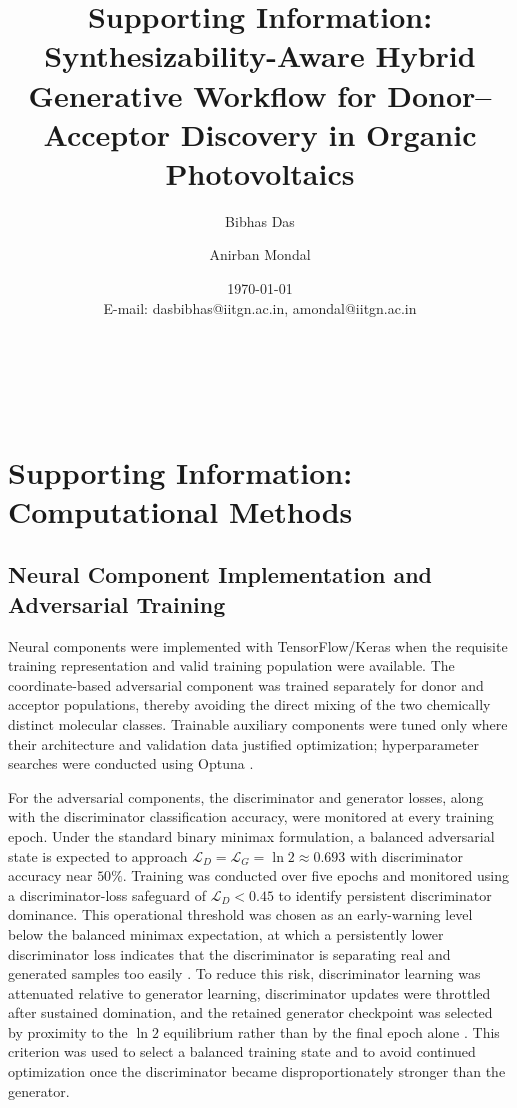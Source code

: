 \documentclass[12pt]{article}
\title{Supporting Information: \\ Synthesizability-Aware Hybrid Generative Workflow for Donor--Acceptor Discovery in Organic Photovoltaics}
\author[1,*]{Bibhas Das}
\author[1,*]{Anirban Mondal}
\affil[1]{\small Department of Chemistry, Indian Institute of Technology Gandhinagar, Gujarat, 382355, India}
\date{\small\today\\ {E-mail: dasbibhas@iitgn.ac.in, amondal@iitgn.ac.in}}
\makeatletter
\renewcommand{\maketitle}{
\begin{center}
{\LARGE \textbf{\@title}} \\[1em]   %
{\large \@author} \\[1em]           %
{\small \@date}                     %
\end{center}
}
\makeatother
\begin{document}
\maketitle
\clearpage

\section{Supporting Information: Computational Methods}
\subsection{Neural Component Implementation and Adversarial Training}
Neural components were implemented with TensorFlow/Keras 
\cite{abadi2016tensorflow} when the requisite training representation and valid training population were available. The coordinate-based adversarial component was trained separately for donor and acceptor populations, thereby avoiding the direct mixing of the two chemically distinct molecular classes. Trainable auxiliary components were tuned only where their architecture and validation data justified optimization; hyperparameter searches were conducted using Optuna 
\cite{akiba2019optuna}.

For the adversarial components, the discriminator and generator losses, along with the discriminator classification accuracy, were monitored at every training epoch. Under the standard binary minimax formulation, a balanced adversarial state is expected to approach $\mathcal{L}_{D}=\mathcal{L}_{G}=\ln 2 \approx 0.693$ with discriminator accuracy near $50\%$. Training was conducted over five epochs and 
monitored using a discriminator-loss safeguard of $\mathcal{L}_{D}<0.45$ to identify persistent discriminator dominance. This operational threshold was chosen as an early-warning level below the balanced minimax expectation, at which a persistently lower discriminator loss indicates that the discriminator is separating real and generated samples too easily \cite{goodfellow2014generative}. To reduce this risk, discriminator learning was attenuated relative to generator learning, discriminator updates were throttled after sustained domination, and the retained generator checkpoint was selected by proximity to the $\ln 2$ equilibrium rather than by the final epoch alone \cite{salimans2016improved}. This criterion was used to select a balanced training state and to avoid continued optimization once the discriminator became disproportionately stronger than the generator.
\end{document}
